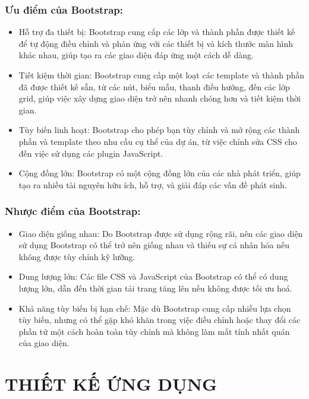 \documentclass[a4paper]{article}
\begin{document}
\subsubsection{Ưu điểm của Bootstrap:}
\begin{itemize}
	\item Hỗ trợ đa thiết bị: Bootstrap cung cấp các lớp và thành phần được thiết kế để tự động điều chỉnh và phản ứng với các thiết bị và kích thước màn hình khác nhau, giúp tạo ra các giao diện đáp ứng một cách dễ dàng.
    \item Tiết kiệm thời gian: Bootstrap cung cấp một loạt các template và thành phần đã được thiết kế sẵn, từ các nút, biểu mẫu, thanh điều hướng, đến các lớp grid, giúp việc xây dựng giao diện trở nên nhanh chóng hơn và tiết kiệm thời gian.
    \item Tùy biến linh hoạt: Bootstrap cho phép bạn tùy chỉnh và mở rộng các thành phần và template theo nhu cầu cụ thể của dự án, từ việc chỉnh sửa CSS cho đến việc sử dụng các plugin JavaScript.
    \item Cộng đồng lớn: Bootstrap có một cộng đồng lớn của các nhà phát triển, giúp tạo ra nhiều tài nguyên hữu ích, hỗ trợ, và giải đáp các vấn đề phát sinh.
\end{itemize}
\subsubsection{Nhược điểm của Bootstrap:}
\begin{itemize}
	\item Giao diện giống nhau: Do Bootstrap được sử dụng rộng rãi, nên các giao diện sử dụng Bootstrap có thể trở nên giống nhau và thiếu sự cá nhân hóa nếu không được tùy chỉnh kỹ lưỡng.
    \item Dung lượng lớn: Các file CSS và JavaScript của Bootstrap có thể có dung lượng lớn, dẫn đến thời gian tải trang tăng lên nếu không được tối ưu hoá.
    \item Khả năng tùy biến bị hạn chế: Mặc dù Bootstrap cung cấp nhiều lựa chọn tùy biến, nhưng có thể gặp khó khăn trong việc điều chỉnh hoặc thay đổi các phần tử một cách hoàn toàn tùy chỉnh mà không làm mất tính nhất quán của giao diện.
\end{itemize}

\section{THIẾT KẾ ỨNG DỤNG}
\end{document}
